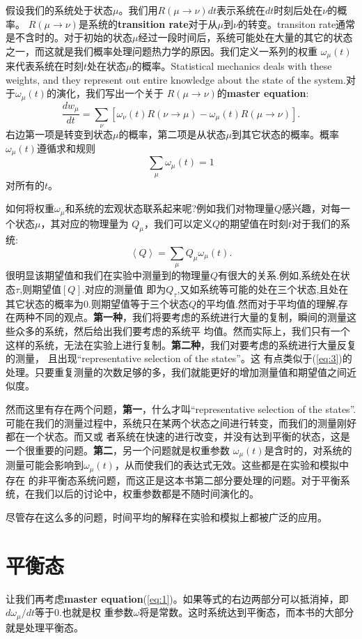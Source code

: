 假设我们的系统处于状态$\mu$。我们用$R(\mu\rightarrow{}\nu)dt$表示系统在$dt$时刻后处在$\nu$的概率。
$R(\mu\rightarrow{}\nu)$是系统的{\textbf{transition rate}}对于从$\mu$到$\nu$的转变。transiton rate通常是不含时的。对于初始的状态$\mu$经过一段时间后，系统可能处在大量的其它的状态之一，而这就是我们概率处理问题热力学的原因。我们定义一系列的权重
$\omega_{\mu}(t)$来代表系统在时刻$t$处在状态$\mu$的概率。Statistical mechanics deals with these weights, and they
represent out entire knowledge about the state of the system.对于$\omega_{\mu}(t)$的演化，我们写出一个关于
$R(\mu\rightarrow{}\nu)$的\textbf{master equation}:
\begin{equation}
  \label{eq:1}
  \frac{dw_{\mu}}{dt} = \sum_{\nu}\left[\omega_{\nu}(t)R(\nu\rightarrow{}\mu)-\omega_{\mu}(t)R(\mu\rightarrow{}\nu)\right].
\end{equation}
右边第一项是转变到状态$\mu$的概率，第二项是从状态$\mu$到其它状态的概率。概率$\omega_{\mu}(t)$遵循求和规则
\begin{equation}
  \label{eq:2}
  \sum_{\mu}\omega_{\mu}(t) = 1
\end{equation}
对所有的$t$。
\par
如何将权重$\omega_{\mu}$和系统的宏观状态联系起来呢?例如我们对物理量$Q$感兴趣，对每一个状态$\mu$，其对应的物理量为
$Q_{\mu}$，我们可以定义$Q$的期望值在时刻$t$对于我们的系统:
\begin{equation}
  \label{eq:3}
  \left<Q\right> = \sum_{\mu}Q_{\mu}\omega_{\mu}(t).
\end{equation}
很明显该期望值和我们在实验中测量到的物理量$Q$有很大的关系.例如,系统处在状态$\tau$,则期望值$\left[Q\right].$对应的测量值
即为$Q_{\tau}$,又如系统等可能的处在三个状态,且处在其它状态的概率为0.则期望值等于三个状态$Q$的平均值.然而对于平均值的理解,存
在两种不同的观点。\textbf{第一种}，我们将要考虑的系统进行大量的复制，瞬间的测量这些众多的系统，然后给出我们要考虑的系统平
均值。然而实际上，我们只有一个这样的系统，无法在实验上进行复制。\textbf{第二种}，我们对要考虑的系统进行大量反复的测量，
且出现\textquotedblleft{representative selection of the states}\textquotedblright{}。这
有点类似于(\ref{eq:3})的处理。只要重复测量的次数足够的多，我们就能更好的增加测量值和期望值之间近似度。
\par
然而这里有存在两个问题，\textbf{第一}，什么才叫\textquotedblleft{representative selection of the
  states}\textquotedblright.可能在我们的测量过程中，系统只在某两个状态之间进行转变，而我们的测量刚好都在一个状态。而又或
者系统在快速的进行改变，并没有达到平衡的状态，这是一个很重要的问题。\textbf{第二}，另一个问题就是权重参数
$\omega_{\mu}(t)$是含时的，对系统的测量可能会影响到$\omega_{\mu}(t)$，从而使我们的表达式无效。这些都是在实验和模拟中存在
的非平衡态系统问题，而这正是这本书第二部分要处理的问题。对于平衡系统，在我们以后的讨论中，权重参数都是不随时间演化的。
\par
尽管存在这么多的问题，时间平均的解释在实验和模拟上都被广泛的应用。








\section{平衡态}
让我们再考虑\textbf{master equation}(\ref{eq:1})。如果等式的右边两部分可以抵消掉，即$d\omega_{\mu}/dt$等于0.也就是权
重参数$\omega$将是常数。这时系统达到平衡态，而本书的大部分就是处理平衡态。
